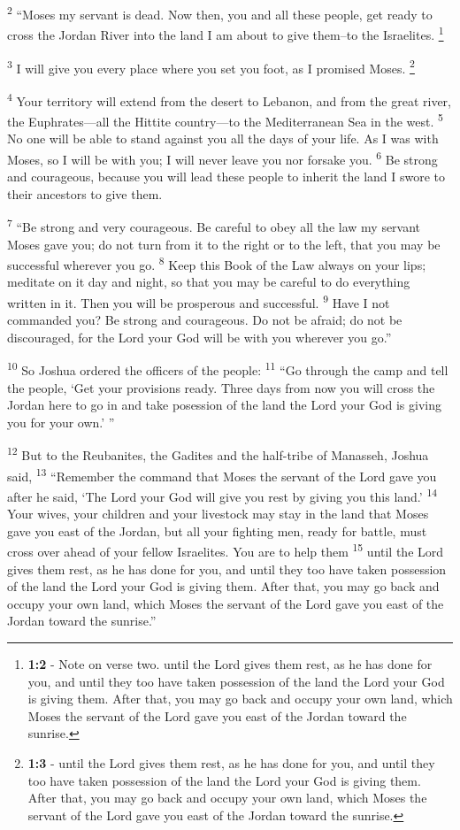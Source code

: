 \documentclass[12pt,twoside]{article}
\newcommand{\vs}[1]{\textsuperscript{#1}}
\newcommand{\vnote}[2]{%
  \begingroup
  \renewcommand\thefootnote{}%
  \footnote{\textbf{}#2}%
  \addtocounter{footnote}{-1}%
  \endgroup
}
\begin{document}
\hspace*{15pt}
\vs{2} ``Moses my servant is dead. Now then, you and all these people, get ready to cross the Jordan River into the land I am about to give them--to the Israelites.\vnote{2}{\textbf{1:2} - Note on verse two. until the Lord gives them rest, as he has done for you, and until they too have taken possession of the land the Lord your God is giving them. After that, you may go back and occupy your own land, which Moses the servant of the Lord gave you east of the Jordan toward the sunrise.}
\vs{3} I will give you every place where you set you foot, as I promised Moses.\vnote{3}{\textbf{1:3} - until the Lord gives them rest, as he has done for you, and until they too have taken possession of the land the Lord your God is giving them. After that, you may go back and occupy your own land, which Moses the servant of the Lord gave you east of the Jordan toward the sunrise.}
\vs{4} Your territory will extend from the desert to Lebanon, and from the great river, the Euphrates---all the Hittite country---to the Mediterranean Sea in the west.
\vs{5} No one will be able to stand against you all the days of your life. As I was with Moses, so I will be with you; I will never leave you nor forsake you.
\vs{6} Be strong and courageous, because you will lead these people to inherit the land I swore to their ancestors to give them.

\vs{7} ``Be strong and very courageous. Be careful to obey all the law my servant Moses gave you; do not turn from it to the right or to the left, that you may be successful wherever you go.
\vs{8} Keep this Book of the Law always on your lips; meditate on it day and night, so that you may be careful to do everything written in it. Then you will be prosperous and successful.
\vs{9} Have I not commanded you? Be strong and courageous. Do not be afraid; do not be discouraged, for the Lord your God will be with you wherever you go.''

\vs{10} So Joshua ordered the officers of the people:
\vs{11} ``Go through the camp and tell the people, `Get your provisions ready. Three days from now you will cross the Jordan here to go in and take posession of the land the Lord your God is giving you for your own.' ''

\vs{12} But to the Reubanites, the Gadites and the half-tribe of Manasseh, Joshua said,
\vs{13} ``Remember the command that Moses the servant of the Lord gave you after he said, `The Lord your God will give you rest by giving you this land.'
\vs{14} Your wives, your children and your livestock may stay in the land that Moses gave you east of the Jordan, but all your fighting men, ready for battle, must cross over ahead of your fellow Israelites. You are to help them
\vs{15} until the Lord gives them rest, as he has done for you, and until they too have taken possession of the land the Lord your God is giving them. After that, you may go back and occupy your own land, which Moses the servant of the Lord gave you east of the Jordan toward the sunrise.''
\end{document}
